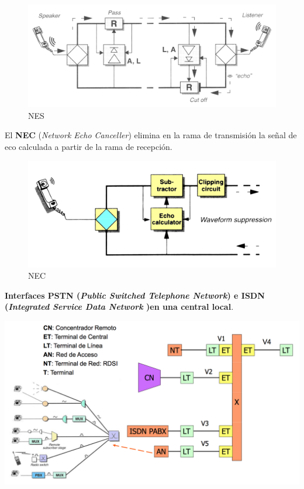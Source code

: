 \documentclass[10pt,portrait, twocolumn]{article}
\begin{document}
	\begin{figure}[!ht]
 		\centering
  		 \includegraphics[scale = 0.25]{images/NES}
		\caption{NES}
	\end{figure}
	
El \textbf{NEC} (\textit{Network Echo Canceller}) elimina en la rama de transmisión la señal de eco calculada a partir de la rama de recepción.


	\begin{figure}[!ht]
 		\centering
  		 \includegraphics[scale = 0.25]{images/NEC}
		\caption{NEC}
	\end{figure}

\textbf{Interfaces PSTN (\textit{Public Switched Telephone Network}) e ISDN (\textit{Integrated Service Data Network })en una central local}.

	\begin{center}
		\includegraphics[scale=0.35]{images/ISDN}
	\end{center}
\end{document}
